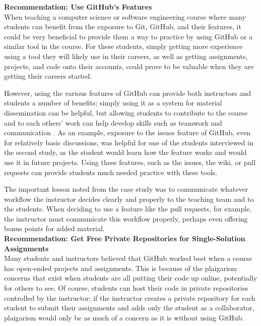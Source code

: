 \textbf{Recommendation: Use GitHub's Features} \\
When teaching a computer science or software engineering course where many students can benefit from the exposure to Git, GitHub, and their features, it could be very beneficial to provide them a way to practice by using GitHub or a similar tool in the course. For these students, simply getting more experience using a tool they will likely use in their careers, as well as getting assignments, projects, and code onto their accounts, could prove to be valuable when they are getting their careers started.

However, using the various features of GitHub can provide both instructors and students a number of benefits; simply using it as a system for material dissemination can be helpful, but allowing students to contribute to the course and to each others' work can help develop skills such as teamwork and communication \cite{hamer2006some}. As an example, exposure to the issues feature of GitHub, even for relatively basic discussions, was helpful for one of the students interviewed in the second study, as the student would learn how the feature works and would use it in future projects. Using these features, such as the issues, the wiki, or pull requests can provide students much needed practice with these tools.

The important lesson noted from the case study was to communicate whatever workflow the instructor decides clearly and properly to the teaching team and to the students. When deciding to use a feature like the pull requests, for example, the instructor must communicate this workflow properly, perhaps even offering bonus points for added material. \\


\textbf{Recommendation: Get Free Private Repositories for Single-Solution Assignments} \\
Many students and instructors believed that GitHub worked best when a course has open-ended projects and assignments. This is because of the plaigarism concerns that exist when students are all putting their code up online, potentially for others to see. Of course, students can host their code in private repositories controlled by the instructor; if the instructor creates a private repository for each student to submit their assignments and adds only the student as a collaborator, plaigarism would only be as much of a concern as it is without using GitHub.


